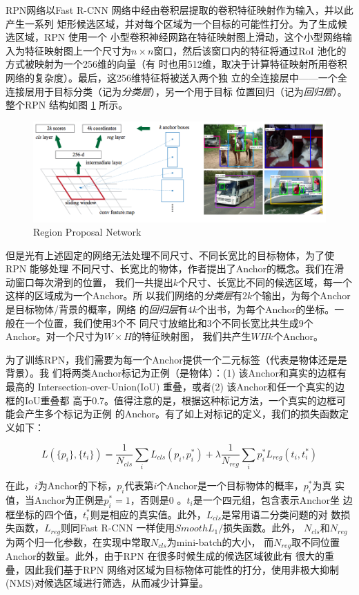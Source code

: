 RPN网络以Fast R-CNN 网络中经由卷积层提取的卷积特征映射作为输入，并以此产生一系列
矩形候选区域，并对每个区域为一个目标的可能性打分。为了生成候选区域，RPN 使用一个
小型卷积神经网路在特征映射图上滑动，这个小型网络输入为特征映射图上一个尺寸为$n
\times n$窗口，然后该窗口内的特征将通过RoI 池化的方式被映射为一个256维的向量（有
时也用512维，取决于计算特征映射所用卷积网络的复杂度）。最后，这256维特征将被送入两个独
立的全连接层中——一个全连接层用于目标分类（记为\textit{分类层}），另一个用于目标
位置回归（记为\textit{回归层}）。整个RPN 结构如图 \ref{Fig:RPN} 所示。

\begin{figure}[ht]
  \centering
  \includegraphics[width=0.8\linewidth]{./Figure/RPN.png}
  \caption{Region Proposal Network\cite{Ren:2015ug}}\label{Fig:RPN}
\end{figure}

但是光有上述固定的网络无法处理不同尺寸、不同长宽比的目标物体，为了使RPN 能够处理
不同尺寸、长宽比的物体，作者提出了Anchor的概念。我们在滑动窗口每次滑到的位置，
我们一共提出$k$个尺寸、长宽比不同的候选区域，每一个这样的区域成为一个Anchor。所
以我们网络的\textit{分类层}有$2k$个输出，为每个Anchor是目标物体/背景的概率，网络
的\textit{回归层}有$4k$个出书，为每个Anchor的坐标。一般在一个位置，我们使用3个不
同尺寸放缩比和3个不同长宽比共生成9个Anchor。对一个尺寸为$W \times H$的特征映射图，
我们共产生$WHk$个Anchor。

为了训练RPN，我们需要为每一个Anchor提供一个二元标签（代表是物体还是是背景）。我
们将两类Anchor标记为正例（是物体）：(1) 该Anchor和真实的边框有最高的
Intersection-over-Union(IoU) 重叠，或者(2) 该Anchor和任一个真实的边框的IoU重叠都
高于0.7。值得注意的是，根据这种标记方法，一个真实的边框可能会产生多个标记为正例
的Anchor。有了如上对标记的定义，我们的损失函数定义如下：

\[
L(\{p_i\}, \{t_i\}) = \frac{1}{N_{cls}}\sum_i{L_{cls}(p_i, p_i^*)} + \lambda\frac{1}{N_{reg}}\sum_i{p_i^*L_{reg}(t_i,t_i^*)}
\]

在此，$i$为Anchor的下标，$p_i$代表第$i$个Anchor是一个目标物体的概率，$p_i^*$为真
实值，当Anchor为正例是$p_i^* = 1$，否则是0 。$t_i$是一个四元组，包含表示Anchor坐
边框坐标的四个值，$t_i^*$则是相应的真实值。此外，$L_{cls}$是常用语二分类问题的对
数损失函数，$L_{reg}$则同Fast R-CNN 一样使用$Smooth L_1/$损失函数。此外，
$N_{cls}$和$N_{reg}$为两个归一化参数，在实现中常取$N_{cls}$为mini-batch的大小，
而$N_{reg}$取不同位置Anchor的数量。此外，由于RPN 在很多时候生成的候选区域彼此有
很大的重叠，因此我们基于RPN 网络对区域为目标物体可能性的打分，使用非极大抑制
(NMS)对候选区域进行筛选，从而减少计算量。

